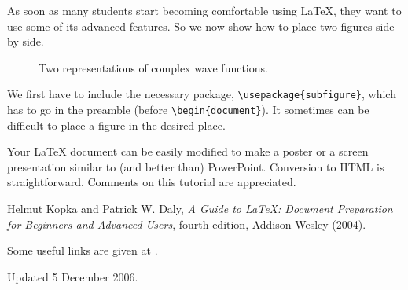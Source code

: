 \documentclass[12pt]{article}
\begin{document}
 As soon as many students start becoming comfortable using \LaTeX, they want
 to use some of its advanced features. So we now show how to place two
 figures side by side.

 \begin{figure}[h!]
  \begin{center}
   \caption{\label{fig:qm/complexfunctions} Two representations of complex
   wave functions.}
  \end{center}
 \end{figure}

 We first have to include the necessary package,
 \verb+\usepackage{subfigure}+, which has to go in the preamble (before
 \verb+\begin{document}+). It sometimes can be difficult to place a figure in
 the desired place.

 Your LaTeX document can be easily modified to make a poster or a screen
 presentation similar to (and better than) PowerPoint. Conversion to HTML is
 straightforward. Comments on this tutorial are appreciated.

 \begin{thebibliography}{5}

  Helmut Kopka and Patrick W. Daly, \textsl{A Guide to
  \LaTeX: Document Preparation for Beginners and Advanced Users},
  fourth edition, Addison-Wesley (2004).

  Some useful links are
  given at \url{}.

 \end{thebibliography}

 {\small \noindent Updated 5 December 2006.}
\end{document}
